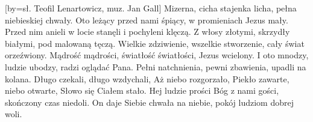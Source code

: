[by={sł. Teofil Lenartowicz, muz. Jan Gall}]
\beginverse
Mizerna, cicha stajenka licha,
pełna niebieskiej chwały.
Oto leżący przed nami śpiący,
w promieniach Jezus mały.
\endverse
\beginverse
Przed nim anieli w locie stanęli
i pochyleni klęczą.
Z włosy złotymi, skrzydły białymi,
pod malowaną tęczą.
\endverse
\beginverse
Wielkie zdziwienie, wszelkie stworzenie,
cały świat orzeźwiony.
Mądrość mądrości, światłość światłości,
Jezus wcielony.
\endverse
\beginverse
I oto mnodzy, ludzie ubodzy,
radzi oglądać Pana.
Pełni natchnienia, pewni zbawienia,
upadli na kolana.
\endverse
\beginverse
Długo czekali, długo wzdychali,
Aż niebo rozgorzało,
Piekło zawarte, niebo otwarte,
Słowo się Ciałem stało.
\endverse
\beginverse
Hej ludzie prości Bóg z nami gości,
skończony czas niedoli.
On daje Siebie chwała na niebie,
pokój ludziom dobrej woli.
\endverse
\endsong